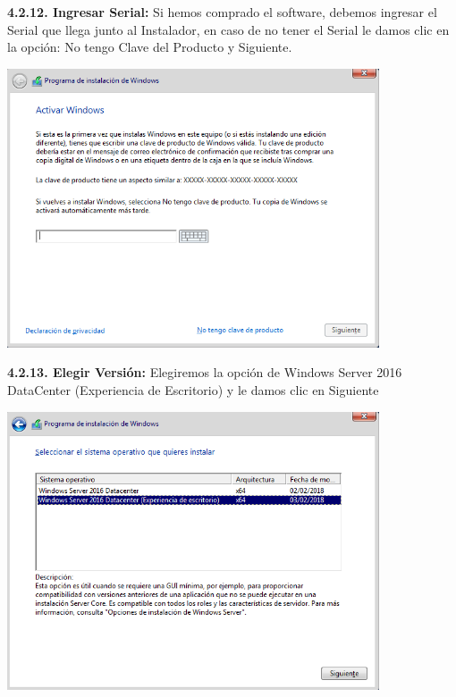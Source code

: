 \textbf {4.2.12. Ingresar Serial:} Si hemos comprado el software, debemos ingresar el Serial que llega junto al Instalador, en caso de no tener el Serial le damos clic en la opción: No tengo Clave del Producto y Siguiente.
\begin{center}
  \includegraphics[width=11cm]{Imagenes/Ingresar_Serial.png}
\end{center}
\break

\textbf {4.2.13. Elegir Versión:} Elegiremos la opción de Windows Server 2016 DataCenter (Experiencia de Escritorio) y le damos clic en Siguiente
\begin{center}
  \includegraphics[width=11cm]{Imagenes/Elegir_Version.png}
\end{center}

